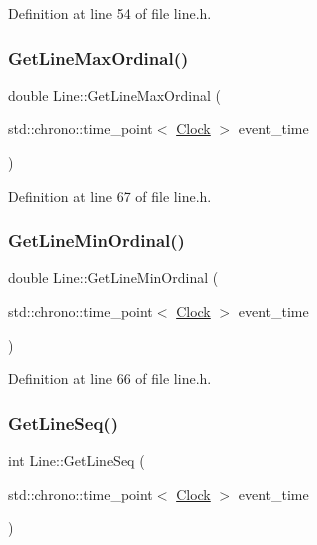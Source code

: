Definition at line 54 of file line.\+h.

\mbox{\label{class_line_a3fc7779998759b641ec2b7bc8515563a}} 
\subsubsection{\texorpdfstring{Get\+Line\+Max\+Ordinal()}{GetLineMaxOrdinal()}}
{\footnotesize\ttfamily double Line\+::\+Get\+Line\+Max\+Ordinal (\begin{DoxyParamCaption}\item[{std\+::chrono\+::time\+\_\+point$<$ \hyperlink{universe_8h_a0ef8d951d1ca5ab3cfaf7ab4c7a6fd80}{Clock} $>$}]{event\+\_\+time }\end{DoxyParamCaption})\hspace{0.3cm}{\ttfamily [inline]}}



Definition at line 67 of file line.\+h.

\mbox{\label{class_line_a7b105f0af704489446cc93302c30813d}} 
\subsubsection{\texorpdfstring{Get\+Line\+Min\+Ordinal()}{GetLineMinOrdinal()}}
{\footnotesize\ttfamily double Line\+::\+Get\+Line\+Min\+Ordinal (\begin{DoxyParamCaption}\item[{std\+::chrono\+::time\+\_\+point$<$ \hyperlink{universe_8h_a0ef8d951d1ca5ab3cfaf7ab4c7a6fd80}{Clock} $>$}]{event\+\_\+time }\end{DoxyParamCaption})\hspace{0.3cm}{\ttfamily [inline]}}



Definition at line 66 of file line.\+h.

\mbox{\label{class_line_a8764cb987ec4af839f30411dc47a835a}} 
\subsubsection{\texorpdfstring{Get\+Line\+Seq()}{GetLineSeq()}}
{\footnotesize\ttfamily int Line\+::\+Get\+Line\+Seq (\begin{DoxyParamCaption}\item[{std\+::chrono\+::time\+\_\+point$<$ \hyperlink{universe_8h_a0ef8d951d1ca5ab3cfaf7ab4c7a6fd80}{Clock} $>$}]{event\+\_\+time }\end{DoxyParamCaption})\hspace{0.3cm}{\ttfamily [inline]}}



